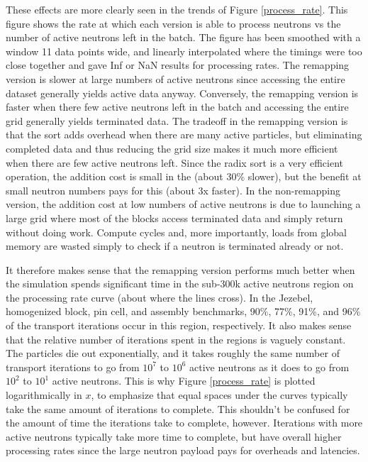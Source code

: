 These effects are more clearly seen in the trends of Figure \ref{process_rate}.  This figure shows the rate at which each version is able to process neutrons vs the number of active neutrons left in the batch.  The figure has been smoothed with a window 11 data points wide, and linearly interpolated where the timings were too close together and gave Inf or NaN results for processing rates.  The remapping version is slower at large numbers of active neutrons since accessing the entire dataset generally yields active data anyway.  Conversely, the remapping version is faster when there few active neutrons left in the batch and accessing the entire grid generally yields terminated data.  The tradeoff in the remapping version is that the sort adds overhead when there are many active particles, but eliminating completed data and thus reducing the grid size makes it much more efficient when there are few active neutrons left.  Since the radix sort is a very efficient operation, the addition cost is small in the (about 30\% slower), but the benefit at small neutron numbers pays for this (about 3x faster).   In the non-remapping version, the addition cost at low numbers of active neutrons is due to launching a large grid where most of the blocks access terminated data and simply return without doing work.  Compute cycles and, more importantly, loads from global memory are wasted simply to check if a neutron is terminated already or not.

It therefore makes sense that the remapping version performs much better when the simulation spends significant time in the sub-300k active neutrons region on the processing rate curve (about where the lines cross).  In the Jezebel, homogenized block, pin cell, and assembly benchmarks, 90\%, 77\%, 91\%, and 96\% of the transport iterations occur in this region, respectively.  It also makes sense that the relative number of iterations  spent in the regions is vaguely constant.  The particles die out exponentially, and it takes roughly the same number of transport iterations to go from $10^7$ to $10^6$ active neutrons as it does to go from $10^2$ to $10^1$ active neutrons.  This is why Figure \ref{process_rate} is plotted logarithmically in $x$, to emphasize that equal spaces under the curves  typically take the same amount of iterations to complete.  This shouldn't be confused for the amount of time the iterations take to complete, however.  Iterations with more active neutrons typically take more time to complete, but have overall higher processing rates since the large neutron payload pays for overheads and latencies.

